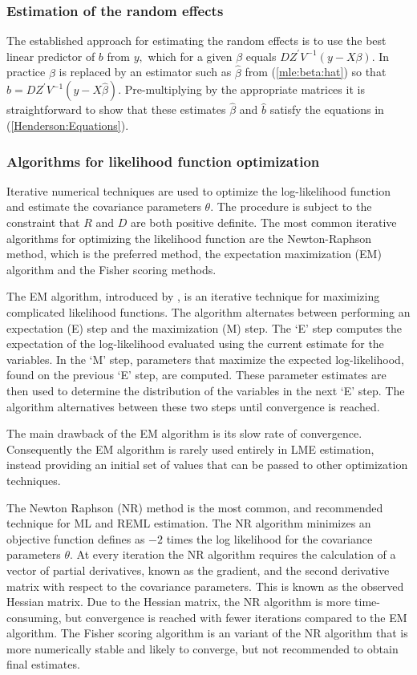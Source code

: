 \documentclass[12pt, a4paper]{report}
\theoremstyle{plain}
\theoremstyle{definition}
\theoremstyle{remark}
\begin{document}
	\subsubsection{Estimation of the random effects}
	
	The established approach for estimating the random effects is to use the best linear predictor of $b$ from $y,$ which for a given $\beta$ equals $DZ^\prime V^{-1}(y - X \beta).$ In practice $\beta$ is replaced by an estimator such as $\hat{\beta}$ from (\ref{mle:beta:hat}) so that $\hat{b} = DZ^\prime V^{-1}(y - X \hat{\beta}).$ Pre-multiplying by the appropriate matrices it is straightforward to show that these estimates $\hat{\beta}$ and $\hat{b}$ satisfy the equations in (\ref{Henderson:Equations}).
	
	\subsubsection{Algorithms for likelihood function optimization}Iterative numerical techniques are used to optimize the log-likelihood function and estimate the covariance parameters $\theta$. The procedure is subject to the constraint that $R$ and $D$ are both positive definite. The most common iterative algorithms for optimizing the likelihood function are the Newton-Raphson method, which is the preferred method, the expectation maximization (EM) algorithm and the Fisher scoring methods.
	
	The EM algorithm, introduced by \citet{EM}, is an iterative technique for maximizing complicated likelihood functions. The algorithm alternates between performing an expectation (E) step
	and the maximization (M) step. The `E' step computes the expectation of the log-likelihood evaluated using the current
	estimate for the variables. In the `M' step, parameters that maximize the expected log-likelihood, found on the previous `E' step, are computed. These parameter estimates are then used to determine the distribution of the variables in the next `E' step. The algorithm alternatives between these two steps until convergence is reached.
	
	The main drawback of the EM algorithm is its slow rate of
	convergence. Consequently the EM algorithm is rarely used entirely in LME estimation,
	instead providing an initial set of values that can be passed to
	other optimization techniques.
	
	The Newton Raphson (NR) method is the most common, and recommended technique for ML and
	REML estimation. The NR algorithm minimizes an objective function defines as $-2$ times the log likelihood for the covariance parameters $\theta$. At every iteration the NR algorithm requires the
	calculation of a vector of partial derivatives, known as the gradient, and the second derivative matrix with respect to the covariance parameters. This is known as the observed Hessian matrix. Due to the Hessian matrix, the NR algorithm is more time-consuming, but convergence is reached with fewer iterations compared to the EM algorithm. The Fisher scoring algorithm is an variant of the NR algorithm that is more numerically stable and likely to converge, but not recommended to obtain final estimates.
	
\end{document}
